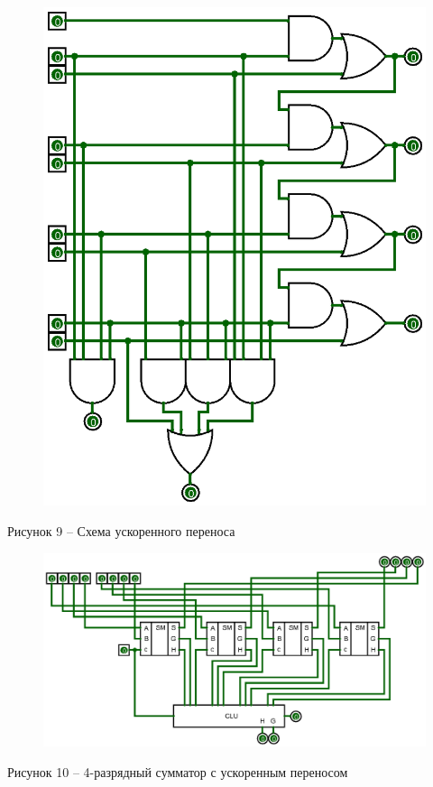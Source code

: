 \documentclass[a4paper,14pt]{extarticle}
\begin{document}
	\begin{figure}[h]
		\centering
		\includegraphics[width=0.6\linewidth]{images/s-4-2}
	\end{figure}
	\begin{center}
		Рисунок 9 – Схема ускоренного переноса
	\end{center}
	
	\pagebreak
	\begin{figure}[h]
		\centering
		\includegraphics[width=0.9\linewidth]{images/s-4-3}
	\end{figure}
	\begin{center}
		Рисунок 10 – 4-разрядный сумматор с ускоренным переносом
	\end{center}
	
\end{document}
